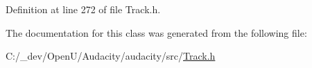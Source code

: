 Definition at line 272 of file Track.\+h.



The documentation for this class was generated from the following file\+:\begin{DoxyCompactItemize}
\item 
C\+:/\+\_\+dev/\+Open\+U/\+Audacity/audacity/src/\hyperlink{src_2track_8h}{Track.\+h}\end{DoxyCompactItemize}
